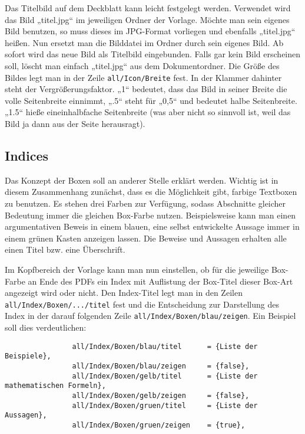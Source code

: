 				Das Titelbild auf dem Deckblatt kann leicht festgelegt werden. Verwendet wird das Bild „titel.jpg“ im jeweiligen Ordner der Vorlage. Möchte man sein eigenes Bild benutzen, so muss dieses im JPG-Format vorliegen und ebenfalls „titel.jpg“ heißen. Nun ersetzt man die Bilddatei im Ordner durch sein eigenes Bild. Ab sofort wird das neue Bild als Titelbild eingebunden. Falls gar kein Bild erscheinen soll, löscht man einfach „titel.jpg“ aus dem Dokumentordner. Die Größe des Bildes legt man in der Zeile \texttt{all/Icon/Breite} fest. In der Klammer dahinter steht der Vergrößerungsfaktor. „1“ bedeutet, dass das Bild in seiner Breite die volle Seitenbreite einnimmt, „.5“ steht für „0,5“ und bedeutet halbe Seitenbreite. „1.5“ hieße eineinhalbfache Seitenbreite (was aber nicht so sinnvoll ist, weil das Bild ja dann aus der Seite herausragt). 
				
			\subsection{Indices}
			
				Das Konzept der Boxen soll an anderer Stelle erklärt werden. Wichtig ist in diesem Zusammenhang zunächst, dass es die Möglichkeit gibt, farbige Textboxen zu benutzen. Es stehen drei Farben zur Verfügung, sodass Abschnitte gleicher Bedeutung immer die gleichen Box-Farbe nutzen. Beispielsweise kann man einen argumentativen Beweis in einem blauen, eine selbst entwickelte Aussage immer in einem grünen Kasten anzeigen lassen. Die Beweise und Aussagen erhalten alle einen Titel bzw. eine Überschrift. 
				
				Im Kopfbereich der Vorlage kann man nun einstellen, ob für die jeweilige Box-Farbe an Ende des PDFs ein Index mit Auflistung der Box-Titel dieser Box-Art angezeigt wird oder nicht. Den Index-Titel legt man in den Zeilen\\ \texttt{all/Index/Boxen/.../titel} fest und die Entscheidung zur Darstellung des Index in der darauf folgenden Zeile \texttt{all/Index/Boxen/blau/zeigen}. Ein Beispiel soll dies verdeutlichen: 
				
				\newpage
				
				\begin{verbatim}
				all/Index/Boxen/blau/titel      = {Liste der Beispiele},
				all/Index/Boxen/blau/zeigen     = {false},
				all/Index/Boxen/gelb/titel      = {Liste der mathematischen Formeln},
				all/Index/Boxen/gelb/zeigen     = {false},
				all/Index/Boxen/gruen/titel     = {Liste der Aussagen},
				all/Index/Boxen/gruen/zeigen    = {true},
				\end{verbatim}
				
